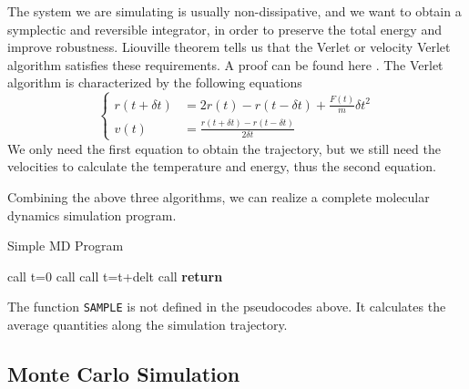 \documentclass[letterpaper,12pt]{article}
\numberwithin{equation}{section}
\begin{document}
The system we are simulating is usually non-dissipative, and we want to obtain a symplectic and reversible integrator, in order to preserve the total energy and improve robustness. Liouville theorem tells us that the Verlet or velocity Verlet algorithm satisfies these requirements. A proof can be found here \cite{ORAC}. The Verlet algorithm is characterized by the following equations
\begin{equation}
    \left\{
    \begin{aligned}
        r(t+\delta t)&=2r(t)-r(t-\delta t)+\frac{F(t)}{m}\delta t^2 \\
        v(t)&=\frac{r(t+\delta t)-r(t-\delta t)}{2\delta t}
    \end{aligned}
    \right.
\end{equation}
We only need the first equation to obtain the trajectory, but we still need the velocities to calculate the temperature and energy, thus the second equation. 

Combining the above three algorithms, we can realize a complete molecular dynamics simulation program.

\begin{algorithm}[H]
    \caption{Simple MD Program}
    \begin{algorithmic}[1]
        \State call    
        \State t=0
            \State call     
            \State call  
            \State t=t+delt
            \State call   
        \EndWhile
    \State \textbf{return}
    \end{algorithmic}
\end{algorithm}

The function \texttt{SAMPLE} is not defined in the pseudocodes above. It calculates the average quantities along the simulation trajectory.

\subsection{Monte Carlo Simulation}
\end{document}
